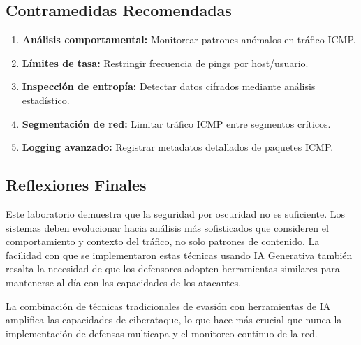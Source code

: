 \documentclass[letter,12pt]{article}
\begin{document}
\subsection*{Contramedidas Recomendadas}

\begin{enumerate}
    \item \textbf{Análisis comportamental:} Monitorear patrones anómalos en tráfico ICMP.
    \item \textbf{Límites de tasa:} Restringir frecuencia de pings por host/usuario.
    \item \textbf{Inspección de entropía:} Detectar datos cifrados mediante análisis estadístico.
    \item \textbf{Segmentación de red:} Limitar tráfico ICMP entre segmentos críticos.
    \item \textbf{Logging avanzado:} Registrar metadatos detallados de paquetes ICMP.
\end{enumerate}

\subsection*{Reflexiones Finales}

Este laboratorio demuestra que la seguridad por oscuridad no es suficiente. Los sistemas deben evolucionar hacia análisis más sofisticados que consideren el comportamiento y contexto del tráfico, no solo patrones de contenido. La facilidad con que se implementaron estas técnicas usando IA Generativa también resalta la necesidad de que los defensores adopten herramientas similares para mantenerse al día con las capacidades de los atacantes.

La combinación de técnicas tradicionales de evasión con herramientas de IA amplifica las capacidades de ciberataque, lo que hace más crucial que nunca la implementación de defensas multicapa y el monitoreo continuo de la red.
\end{document}
